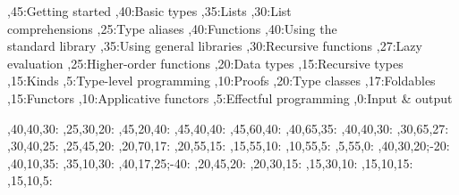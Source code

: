 
\setcounter{diagheight}{50}
\begin{chart}
	,45:{Getting started}
	,40:{Basic types}
	,35:{Lists}
	,30:{List\\comprehensions}
	,25:{Type aliases}
	,40:{Functions}
	,40:{Using the\\standard library}
	,35:{Using general libraries}
	,30:{Recursive functions}
	,27:{Lazy evaluation}
	,25:{Higher-order functions}
	,20:{Data types}
	,15:{Recursive types}
	,15:{Kinds}
	,5:{Type-level programming}
	,10:{Proofs}
	,20:{Type classes}
	,17:{Foldables}
	,15:{Functors}
	,10:{Applicative functors}
	,5:{Effectful programming}
	,0:{Input \& output}
	
	,40,40,30:
	,25,30,20:
	,45,20,40:
	,45,40,40:
	,45,60,40:
	,40,65,35:
	,40,40,30:
	,30,65,27:
	,30,40,25:
	,25,45,20:
	,20,70,17:
	,20,55,15:
	,15,55,10:
	,10,55,5:
	,5,55,0:
	,40,30,20;-20:
	,40,10,35:
	,35,10,30:
	,40,17,25;-40:
	,20,45,20:
	,20,30,15:
	,15,30,10:
	,15,10,15:
	,15,10,5:
\end{chart}

